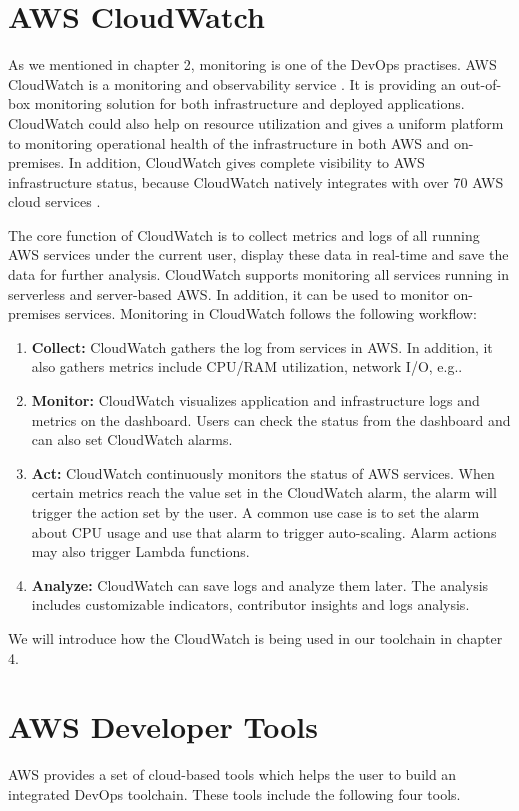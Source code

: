 \section{AWS CloudWatch}
As we mentioned in chapter 2, monitoring is one of the DevOps practises. AWS CloudWatch is a monitoring and observability service \cite{AmazonCl65:online}. It is providing an out-of-box monitoring solution for both infrastructure and deployed applications. CloudWatch could also help on resource utilization and gives a uniform platform to monitoring operational health of the infrastructure in both AWS and on-premises. In addition, CloudWatch gives complete visibility to AWS infrastructure status, because CloudWatch natively integrates with over 70 AWS cloud services \cite{AmazonCl65:online}.
\par
The core function of CloudWatch is to collect metrics and logs of all running AWS services under the current user, display these data in real-time and save the data for further analysis.
CloudWatch supports monitoring all services running in serverless and server-based AWS. In addition, it can be used to monitor on-premises services. Monitoring in CloudWatch follows the following workflow:
\begin{enumerate}
    \item \textbf{Collect:} CloudWatch gathers the log from services in AWS. In addition, it also gathers metrics include CPU/RAM utilization, network I/O, e.g..
    \item \textbf{Monitor:} CloudWatch visualizes application and infrastructure logs and metrics on the dashboard. Users can check the status from the dashboard and can also set CloudWatch alarms.
    \item \textbf{Act:} CloudWatch continuously monitors the status of AWS services.
    When certain metrics reach the value set in the CloudWatch alarm, the alarm will trigger the action set by the user. A common use case is to set the alarm about CPU usage and use that alarm to trigger auto-scaling. Alarm actions may also trigger Lambda functions.
    \item \textbf{Analyze:} CloudWatch can save logs and analyze them later. The analysis includes customizable indicators, contributor insights and logs analysis.
\end{enumerate}
We will introduce how the CloudWatch is being used in our toolchain in chapter 4.
\section{AWS Developer Tools}
AWS provides a set of cloud-based tools which helps the user to build an integrated DevOps toolchain. These tools include the following four tools.
